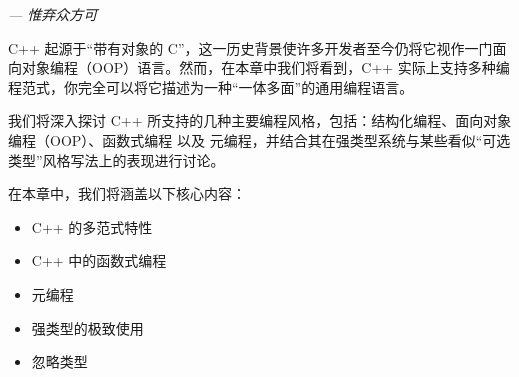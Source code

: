 
\begin{flushright}
\textit{--- 惟弃众方可}
\end{flushright}

C++ 起源于“带有对象的 C”，这一历史背景使许多开发者至今仍将它视作一门面向对象编程（OOP）语言。然而，在本章中我们将看到，C++ 实际上支持多种编程范式，你完全可以将它描述为一种“一体多面”的通用编程语言。

我们将深入探讨 C++ 所支持的几种主要编程风格，包括：结构化编程、面向对象编程（OOP）、函数式编程 以及 元编程，并结合其在强类型系统与某些看似“可选类型”风格写法上的表现进行讨论。

在本章中，我们将涵盖以下核心内容：

\begin{itemize}
\item 
C++ 的多范式特性

\item 
C++ 中的函数式编程

\item 
元编程

\item 
强类型的极致使用

\item 
忽略类型
\end{itemize}


